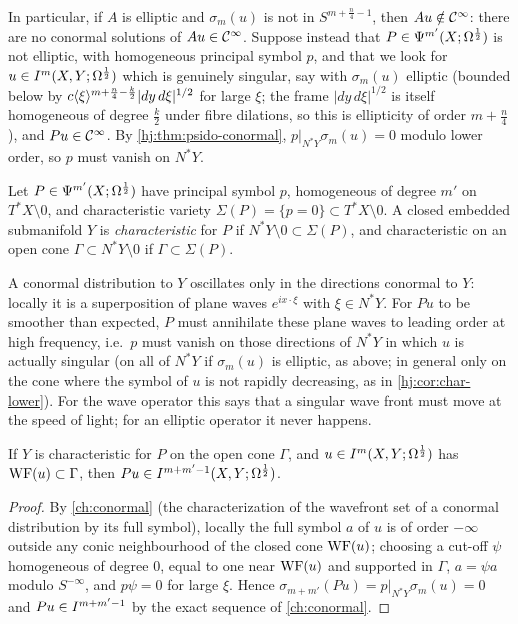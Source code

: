 In particular, if $A$ is elliptic and $\sigma_m(u)$ is not in
$S^{m+\frac n4-1}$, then $Au\notin\mathcal{C}^\infty$: there are no conormal solutions of
$Au\in\mathcal{C}^\infty$.  Suppose instead that $P\in\Psi^{m'}(X;\Omega^{\frac12})$ is not elliptic,
with homogeneous principal symbol $p$, and that we look for
$u\in I^{m}(X,Y;\Omega^{\frac12})$ which is genuinely singular, say with
$\sigma_m(u)$ elliptic (bounded below by $c\langle \xi\rangle^{m+\frac n4-\frac k2}|dy\,d\xi|^{1/2}$
for large $\xi$; the frame $|dy\,d\xi|^{1/2}$ is itself homogeneous of degree $\frac k2$
under fibre dilations, so this is ellipticity of order $m+\frac n4$), and $Pu\in\mathcal{C}^\infty$.  By \cref{hj:thm:psido-conormal},
$p|_{N^*Y}\sigma_m(u)=0$ modulo lower order, so $p$ must vanish on $N^*Y$.

\begin{definition}\label{hj:def:characteristic}
  Let $P\in\Psi^{m'}(X;\Omega^{\frac12})$ have principal symbol $p$, homogeneous of degree
  $m'$ on $T^*X\setminus0$, and characteristic variety
  $\Sigma(P)=\{p=0\}\subset T^*X\setminus0$.  A closed embedded submanifold $Y$ is
  \emph{characteristic} for $P$ if $N^*Y\setminus0\subset\Sigma(P)$, and
  characteristic on an open cone $\Gamma\subset N^*Y\setminus0$ if
  $\Gamma\subset\Sigma(P)$.
\end{definition}

\begin{discussion}
A conormal distribution to $Y$ oscillates only in the directions conormal to $Y$:
locally it is a superposition of plane waves $e^{ix\cdot\xi}$ with $\xi\in N^*Y$. For
$Pu$ to be smoother than expected, $P$ must annihilate these plane waves to leading
order at high frequency, i.e.\ $p$ must vanish on those directions of $N^*Y$ in which
$u$ is actually singular (on all of $N^*Y$ if $\sigma_m(u)$ is elliptic, as above; in
general only on the cone where the symbol of $u$ is not rapidly decreasing, as in
\cref{hj:cor:char-lower}). For the wave operator this
says that a singular wave front must move at the speed of light; for an elliptic
operator it never happens.
\end{discussion}

\begin{corollary}\label{hj:cor:char-lower}
  If $Y$ is characteristic for $P$ on the open cone $\Gamma$, and
  $u\in I^{m}(X,Y;\Omega^{\frac12})$ has $\operatorname{WF}(u)\subset\Gamma$, then
  $Pu\in I^{m+m'-1}(X,Y;\Omega^{\frac12})$.
\end{corollary}
\begin{proof}
  By \cref{ch:conormal} (the characterization of the wavefront set of a
  conormal distribution by its full symbol), locally the full symbol $a$ of $u$
  is of order $-\infty$ outside any conic neighbourhood of the closed cone
  $\operatorname{WF}(u)$; choosing a cut-off $\psi$ homogeneous of degree $0$, equal to one near
  $\operatorname{WF}(u)$ and supported in $\Gamma$, $a=\psi a$ modulo $S^{-\infty}$, and
  $p\psi=0$ for large $\xi$.  Hence $\sigma_{m+m'}(Pu)=p|_{N^*Y}\sigma_m(u)=0$ and
  $Pu\in I^{m+m'-1}$ by the exact sequence of \cref{ch:conormal}.
\end{proof}

